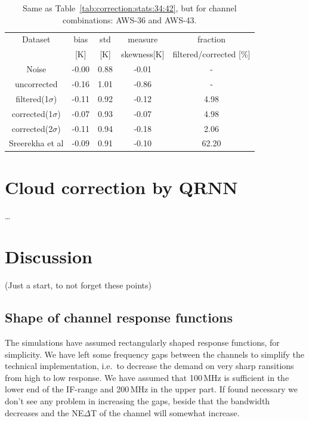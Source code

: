 \documentclass[12pt]{article}
\begin{document}
\begin{table}[!bt]
	\centering
	\begin{tabular}[b]{c|c|c|c|c}
		Dataset  		  &   bias &   std &   measure & fraction  \\
		&   [K]  &   [K] & skewness[K] &				filtered/corrected [\%]\\
		\hline
Noise             &  -0.00 &  0.88 &              -0.01 &                - \\
uncorrected       &  -0.16 &  1.01 &              -0.86 &                - \\
filtered(1$\sigma$)  &  -0.11 &  0.92 &              -0.12 &                4.98 \\
corrected(1$\sigma$) &  -0.07 &  0.93 &              -0.07 &                4.98 \\
corrected(2$\sigma$) &  -0.11 &  0.94 &              -0.18 &                2.06 \\
Sreerekha et al   &  -0.09 &  0.91 &              -0.10 &               62.20 \\
		\hline
	\end{tabular}
	\caption{Same as Table~\ref{tab:correction:stats:34:42}, but for channel combinations: AWS-36 and AWS-43.   }
	\label{tab:correction:stats:36:43}
\end{table}


\section{Cloud correction by QRNN}
%
\dots


\section{Discussion}

(Just a start, to not forget these points)

\subsection{Shape of channel response functions}
%
The simulations have assumed rectangularly shaped response functions, for
simplicity. We have left some frequency gaps between the channels to simplify
the technical implementation, i.e.\ to decrease the demand on very sharp
ransitions from high to low response. We have assumed that 100\,MHz is
sufficient in the lower end of the IF-range and 200\,MHz in the upper part. If
found necessary we don't see any problem in increasing the gaps, beside that
the bandwidth decreases and the NE$\Delta$T of the channel will somewhat
increase.
\end{document}
